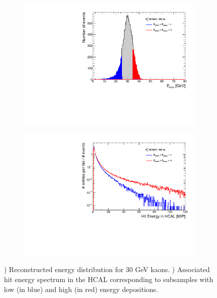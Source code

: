 \begin{figure}[htbp!]
  \centering
  \begin{subfigure}[t]{0.49\textwidth}
    \centering
    \includegraphics[width=1\linewidth]{../Thesis_Plots/ILD/AdditionalPlots/Plots/EnergySum_100ns_30GeV.pdf}
    \caption{} \label{fig:Esum30_100ns}
  \end{subfigure}
  \hfill
  \begin{subfigure}[t]{0.49\textwidth}
    \centering
    \includegraphics[width=1\linewidth]{../Thesis_Plots/ILD/AdditionalPlots/Plots/HitEnergySpectra_100ns_30GeV.pdf}
    \caption{} \label{fig:HitSpectra30_100ns}
  \end{subfigure}
  \caption{) Reconstructed energy distribution for 30 GeV kaons. ) Associated hit energy spectrum in the HCAL corresponding to subsamples with low (in blue) and high (in red) energy depositions.} \label{fig:Response30GeV}
\end{figure}

